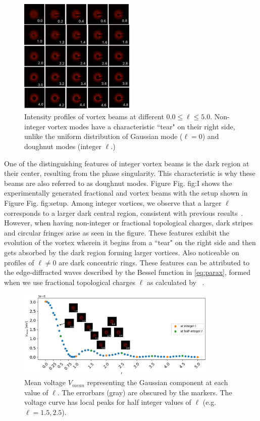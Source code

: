 \documentclass[10pt,a4paper,twoside]{article}
\renewcommand{\l}{\ell}
\renewcommand{\ref}[1]{Fig. #1}
\begin{document}
\begin{figure}[h!]
    \centering
    \includegraphics[width=0.5\textwidth]{intensities.png}
    \caption{Intensity profiles of vortex beams at different $0.0 \le \ell \le 5.0$. Non-integer vortex modes have a characteristic ``tear" on their right side, unlike the uniform distribution of Gaussian mode ($\ell = 0$) and doughnut modes (integer $\ell$.) }
    \label{fig:I}
\end{figure}

One of the distinguishing features of integer vortex beams is the dark region at their center, resulting from the phase singularity. This characteristic is why these beams are also referred to as doughnut modes. Figure \ref{fig:I} shows the experimentally generated fractional and vortex beams with the setup shown in Figure \ref{fig:setup}. Among integer vortices, we observe that a larger $\l$ corresponds to a larger dark central region, consistent with previous results~\cite{padgett2015divergence}. However, when having non-integer or fractional topological charges, dark stripes and circular fringes arise as seen in the figure. These features exhibit the evolution of the vortex wherein it begins from a ``tear" on the right side and then gets absorbed by the dark region forming larger vortices. Also noticeable on profiles of $\l \ne 0$ are dark concentric rings. These features can be attributed to the edge-diffracted waves described by the Bessel function in \eqref{eq:parax}, formed when we use fractional topological charges $\l$ as calculated by ~\cite{Berry}. 

\begin{figure}[h!]
\centering
\includegraphics[width=0.85\textwidth]{SMF.png}
\caption{Mean voltage $V_{mean}$ representing the Gaussian component at each value of $\ell$. The errorbars (gray) are obscured by the markers. The voltage curve has local peaks for half integer values of $\ell$ (e.g. $\ell = 1.5, 2.5$).}
\label{fig:V}
\end{figure}
\end{document}

